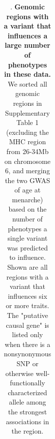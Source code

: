 \documentclass[11pt,titlepage]{article}
\begin{document}
\begin{center}
\begin{table}
{\begin{tabular}{| c| c| c|c| m{5cm}| m{5cm}|}
    \end{tabular}
    }
      \caption{. \textbf{Genomic regions with a variant that influences a large number of phenotypes in these data.} We sorted all genomic regions in Supplementary Table 1 (excluding the MHC region from 26-34Mb on chromosome 6, and merging the two GWAS of age at menarche) based on the number of phenotypes a single variant was predicted to influence. Shown are all regions with a variant that influences six or more traits. The "putative causal gene" is listed only when there is a nonsynonymous SNP or otherwise well-functionally characterized allele among the strongest associations in the region.} 
\end{table}
\end{center}




\end{document}
